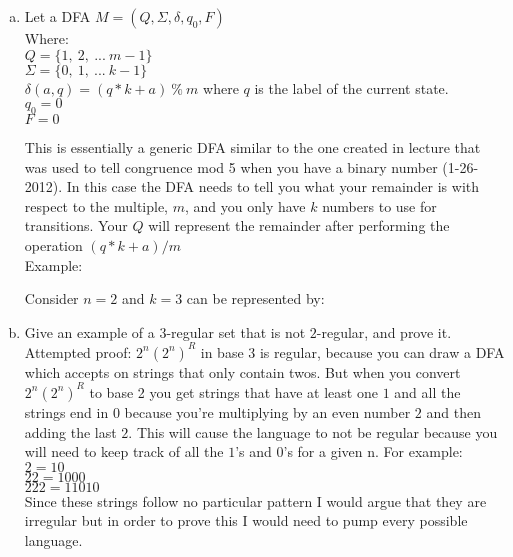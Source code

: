 \documentclass{article}
\begin{document}
    \begin{enumerate}[a)]
    \item Let a DFA $ M = (Q, \Sigma, \delta, q_0, F)$\\
    Where: \\
    $Q = \{1,\ 2,\ ...\ m-1\}$ \\
    $\Sigma = \{0,\ 1,\ ...\ k-1\}$ \\
    $\delta(a, q) = (q * k + a)\ \%\ m$ where $q$ is the label of the current state. \\
    $q_0 = 0$ \\
    $F = 0$

    This is essentially a generic DFA similar to the one created in lecture that was used
    to tell congruence mod 5 when you have a binary number (1-26-2012).
    In this case the DFA needs to tell you what your remainder is with respect to the
    multiple, $m$, and you only have $k$ numbers to use for transitions. Your $Q$ will
    represent the remainder after performing the operation $(q*k + a) \slash m$\\[5pt]

    Example:

    Consider $n = 2$ and $k = 3$ can be represented by:


    \item Give an example of a $3$-regular set that is not $2$-regular, and prove it.\\

    Attempted proof:
    $2^n(2^n)^R$ in base 3 is regular, because you can draw a DFA which accepts on strings
    that only contain twos. But when you convert $2^n(2^n)^R$ to base 2 you get strings
    that have at least one $1$ and all the strings end in $0$ because you're multiplying
    by an even number $2$ and then adding the last $2$. This will cause the language
    to not be regular because you will need to keep track of all the $1$'s and $0$'s for a
    given n. For example: \\
    $2 = 10$ \\
    $22 = 1000$ \\
    $222 = 11010$ \\
    Since these strings follow no particular pattern I would argue that they are irregular
    but in order to prove this I would need to pump every possible language.



\end{enumerate}
\end{document}
